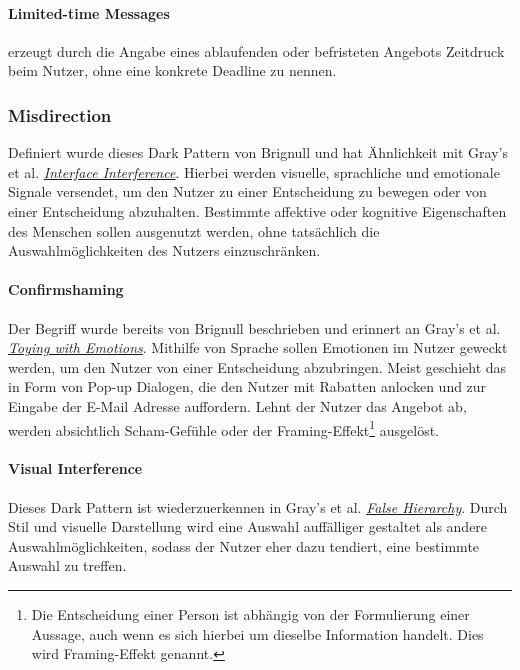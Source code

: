 \documentclass[a4paper]{article}
\begin{document}
\paragraph{Limited-time Messages}
\label{para:limited_time_message}
erzeugt durch die Angabe eines ablaufenden oder befristeten Angebots Zeitdruck beim Nutzer, ohne eine konkrete Deadline zu nennen.

\subsubsection{Misdirection}
\label{sssec:misdirection}
Definiert wurde dieses Dark Pattern von Brignull und hat Ähnlichkeit mit Gray's et al. \hyperref[sssec:interface_interference]{\textit{Interface Interference}}.
Hierbei werden visuelle, sprachliche und emotionale Signale versendet, um den Nutzer zu einer Entscheidung zu bewegen oder von einer Entscheidung abzuhalten. Bestimmte affektive oder kognitive Eigenschaften des Menschen sollen ausgenutzt werden, ohne tatsächlich die Auswahlmöglichkeiten des Nutzers einzuschränken.

\paragraph{Confirmshaming}
\label{para:confirmshaming}
Der Begriff wurde bereits von Brignull beschrieben und erinnert an Gray's et al. \hyperref[subpara:toying_with_emotions]{\textit{Toying with Emotions}}.\newline
Mithilfe von Sprache sollen Emotionen im Nutzer geweckt werden, um den Nutzer von einer Entscheidung abzubringen. Meist geschieht das in Form von Pop-up Dialogen, die den Nutzer mit Rabatten anlocken und zur Eingabe der E-Mail Adresse auffordern. Lehnt der Nutzer das Angebot ab, werden absichtlich Scham-Gefühle oder der Framing-Effekt\footnote{\label{foot:5} Die Entscheidung einer Person ist abhängig von der Formulierung einer Aussage, auch wenn es sich hierbei um dieselbe Information handelt. Dies wird Framing-Effekt genannt.}  ausgelöst.

\paragraph{Visual Interference}
\label{para:visual_interference}
Dieses Dark Pattern ist wiederzuerkennen in Gray's et al. \hyperref[subpara:false_hierarchy]{\textit{False Hierarchy}}. 
Durch Stil und visuelle Darstellung wird eine Auswahl auffälliger gestaltet als andere Auswahlmöglichkeiten, sodass der Nutzer eher dazu tendiert, eine bestimmte Auswahl zu treffen.
\end{document}

